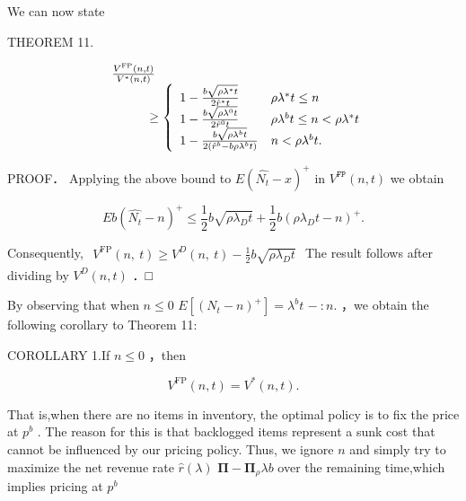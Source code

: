 We can now state

THEOREM 11.

\[
\begin{array} { r l } & { \frac { V ^ { \mathrm { F P } } \left( n , t \right) } { V ^ { * } \left( n , t \right) } } \\ & { \qquad \quad \ge \left\{ \begin{array} { l l } { 1 - \frac { b \sqrt { \rho \lambda ^ { * } t } } { 2 \hat { r } ^ { * } t } } & { \rho \lambda ^ { * } t \le n } \\ { 1 - \frac { b \sqrt { \rho \lambda ^ { 0 } t } } { 2 \hat { r } ^ { 0 } t } } & { \rho \lambda ^ { b } t \le n < \rho \lambda ^ { * } t } \\ { 1 - \frac { b \sqrt { \rho \lambda ^ { b } t } } { 2 ( \hat { r } ^ { b } - b \rho \lambda ^ { b } t ) } } & { n < \rho \lambda ^ { b } t . } \end{array} \right. } \end{array}
\]

PROOF． Applying the above bound to
\(E ( \hat { N _ { t } } - x ) ^ { + }\) in
\({ V } ^ { \mathtt { F P } } ( n , t )\) we obtain

\[
E b ( \hat { N _ { t } } - n ) ^ { + } \leq \frac { 1 } { 2 } b \sqrt { \rho \lambda _ { D } t } + \frac { 1 } { 2 } b ( \rho \lambda _ { D } t - n ) ^ { + } .
\]

Consequently,
\(\begin{array} { r } { V ^ { \operatorname { F P } } ( n , \ t ) \ge V ^ { D } ( n , \ t ) - \frac { 1 } { 2 } b \sqrt { \rho \lambda _ { D } t } } \end{array}\)
The result follows after dividing by \({ V ^ { D } } ( n , t )\) ．□

By observing that when \(n \leq 0\)
\(E [ ( N _ { t } - n ) ^ { + } ] = \lambda ^ { b } t\) \(- \ : n .\)
，we obtain the following corollary to Theorem 11:

COROLLARY 1.If \(n \leq 0\) ，then

\[
V ^ { \mathrm { F P } } ( n , t ) = V ^ { * } ( n , t ) .
\]

That is,when there are no items in inventory, the optimal policy is to
fix the price at \(p ^ { b }\) . The reason for this is that backlogged
items represent a sunk cost that cannot be influenced by our pricing
policy. Thus, we ignore \(n\) and simply try to maximize the net revenue
rate \(\hat { r } ( \lambda )\)
\(\mathbf { \Pi } - \mathbf { \Pi } _ { \rho } \lambda b\) over the
remaining time,which implies pricing at \(p ^ { b }\)

